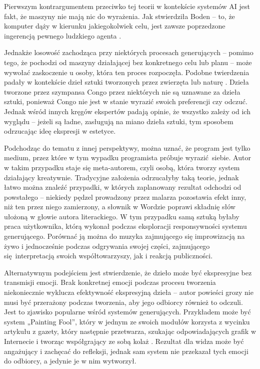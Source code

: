 \documentclass[12pt]{article}
\begin{document}
Pierwszym kontrargumentem przeciwko tej teorii w kontekście systemów AI jest fakt, że maszyny nie mają nic do wyrażenia. Jak stwierdziła Boden – to, że komputer dąży w kierunku jakiegokolwiek celu, jest zawsze poprzedzone ingerencją pewnego ludzkiego agenta \cite{16}.

Jednakże losowość zachodząca przy niektórych procesach generujących – pomimo tego, że pochodzi od maszyny działającej bez konkretnego celu lub planu – może wywołać zaskoczenie u osoby, która ten proces rozpoczęła. Podobne twierdzenia padały w kontekście dzieł sztuki tworzonych przez zwierzęta lub naturę \cite{17}. Dzieła tworzone przez szympansa Congo przez niektórych nie są uznawane za dzieła sztuki, ponieważ Congo nie jest w stanie wyrazić swoich preferencji czy odczuć. Jednak wśród innych kręgów ekspertów padają opinie, że wszystko zależy od ich wyglądu – jeżeli są ładne, zasługują na miano dzieła sztuki, tym sposobem odrzucając ideę ekspresji w estetyce.

Podchodząc do tematu z innej perspektywy, można uznać, że program jest tylko medium, przez które w tym wypadku programista próbuje wyrazić siebie. Autor w takim przypadku staje się meta-autorem, czyli osobą, która tworzy system działający kreatywnie. Tradycyjne założenia odrzucałyby taką teorie, jednak łatwo można znaleźć przypadki, w których zaplanowany rezultat odchodzi od powstałego – niekiedy pędzel prowadzony przez malarza pozostawia efekt inny, niż ten przez niego zamierzony, a słownik w Wordzie poprawi składnię słów ułożoną w głowie autora literackiego. W tym przypadku samą sztuką byłaby praca użytkownika, którą wykonał podczas eksploracji responsywności systemu generującego. Porównać ją można do muzyka zajmującego się improwizacją na żywo i jednocześnie podczas odgrywania swojej części, zajmującego się interpretacją swoich współtowarzyszy, jak i reakcją publiczności.

Alternatywnym podejściem jest stwierdzenie, że dzieło może być ekspresyjne bez transmisji emocji. Brak konkretnej emocji podczas procesu tworzenia niekoniecznie wyklucza efektywność ekspresyjną dzieła – autor powieści grozy nie musi być przerażony podczas tworzenia, aby jego odbiorcy również to odczuli. Jest to zjawisko popularne wśród systemów generujących. Przykładem może być system „Painting Fool”, który w jednym ze swoich modułów korzysta z wycinku artykułu z gazety, który następnie przetwarza, szukając odpowiadających grafik w Internecie i tworząc współgrający ze sobą kolaż \cite{18}. Rezultat dla widza może być angażujący i zachęcać do refleksji, jednak sam system nie przekazał tych emocji do odbiorcy, a jedynie je w nim wytworzył.
\end{document}

